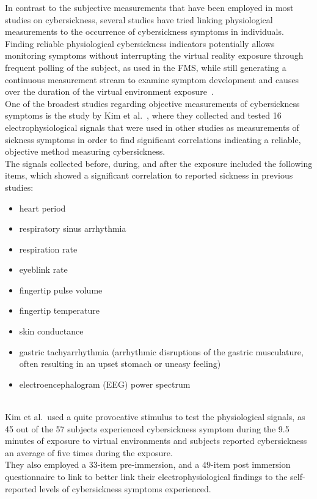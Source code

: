 In contrast to the subjective measurements that have been employed in most studies on cybersickness, several studies
have tried linking physiological measurements to the occurrence of cybersickness symptoms in individuals.
Finding reliable physiological cybersickness indicators potentially allows monitoring symptoms without interrupting
the virtual reality exposure through frequent polling of the subject, as used in the FMS, while still generating a
continuous measurement stream to examine symptom development and causes over the duration of the virtual environment
exposure~\cite{Rebenitsch2016}.
\\
One of the broadest studies regarding objective measurements of cybersickness symptoms is the study by
Kim et al.~\cite{Kim2005}, where they collected and tested 16 electrophysiological signals that were used in other
studies as measurements of sickness symptoms in order to find significant correlations indicating a reliable,
objective method measuring cybersickness.
\\
The signals collected before, during, and after the exposure included the following items, which showed a significant
correlation to reported sickness in previous studies:
\begin{itemize}
    \item heart period
    \item respiratory sinus arrhythmia
    \item respiration rate
    \item eyeblink rate
    \item fingertip pulse volume
    \item fingertip temperature
    \item skin conductance
    \item gastric tachyarrhythmia (arrhythmic disruptions of the gastric musculature, often resulting in an upset
    stomach or uneasy feeling)
    \item electroencephalogram (EEG) power spectrum
\end{itemize}
\\
Kim et al.\ used a quite provocative stimulus to test the physiological signals, as 45 out of the 57 subjects
experienced cybersickness symptom during the 9.5 minutes of exposure to virtual environments and subjects reported
cybersickness an average of five times during the exposure.
\\
They also employed a 33-item pre-immersion, and a 49-item post immersion questionnaire to link to better link their
electrophysiological findings to the self-reported levels of cybersickness symptoms experienced.
